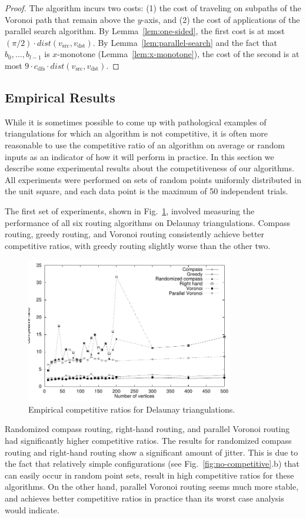 \documentclass[final]{siamltex}
\newcommand{\seclabel}[1]{\label{sec:#1}}
\newcommand{\figlabel}[1]{\label{fig:#1}}
\newcommand{\figref}[1]{\mbox{Fig.~\ref{fig:#1}}}
\newcommand{\lemref}[1]{Lemma~\ref{lem:#1}}
\newcommand{\dist}{\mathit{dist}}
\newcommand{\vsrc}{v_\mathrm{src}}
\newcommand{\vdest}{v_\mathrm{dst}}
\newcommand{\cdfs}{c_\mathrm{dfs}}
\begin{document}
\begin{proof}
The algorithm incurs two costs: (1) the cost of traveling on subpaths
of the Voronoi path that remain above the $y$-axis, and (2) the cost
of applications of the parallel search algorithm.  By
\lemref{one-sided}, the first cost is at most
$(\pi/2)\cdot\dist(\vsrc,\vdest)$.  By \lemref{parallel-search} and
the fact that $b_0,\ldots,b_{l-1}$ is $x$-monotone
(\lemref{x-monotone}), the cost of the second is at most
$9\cdot\cdfs\cdot\dist(\vsrc,\vdest)$.  \qquad\end{proof}

\subsection{Empirical Results}\seclabel{empirical}

While it is sometimes possible to come up with pathological examples
of triangulations for which an algorithm is not competitive, it is
often more reasonable to use the competitive ratio of an algorithm on
average or random inputs as an indicator of how it will perform in
practice.  In this section we describe some experimental results about
the competitiveness of our algorithms.  All experiments were performed
on sets of random points uniformly distributed in the unit square, and
each data point is the maximum of 50 independent trials.

The first set of experiments, shown in
\figref{delaunay}, involved measuring the performance
of all six routing algorithms on Delaunay triangulations.  Compass
routing, greedy routing, and Voronoi routing consistently achieve
better competitive ratios, with greedy routing slightly worse than the
other two.
\begin{figure}
\centerline{\includegraphics[height=2.5in]{delaunay}}
\caption{Empirical competitive ratios for Delaunay triangulations.}
\figlabel{delaunay}
\end{figure}
Randomized compass routing, right-hand routing, and parallel Voronoi
routing had significantly higher competitive ratios.  The results for
randomized compass routing and right-hand routing show a significant
amount of jitter.  This is due to the fact that relatively simple
configurations (see
\figref{no-competitive}.b) that can easily occur in random point
sets, result in high competitive ratios for these algorithms.  On the
other hand, parallel Voronoi routing seems much more stable, and
achieves better competitive ratios in practice than its worst case
analysis would indicate.
\end{document}
